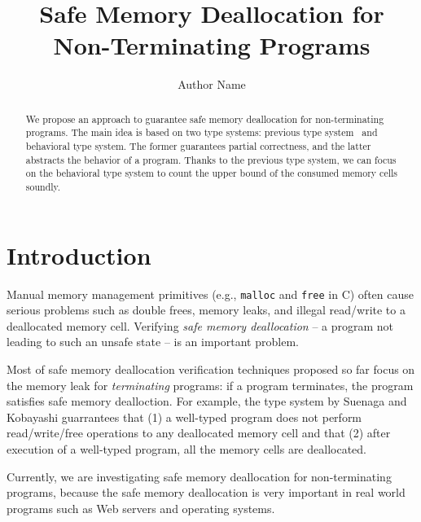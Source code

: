 \documentclass[english]{jssst_ppl} %
\title{Safe Memory Deallocation for Non-Terminating Programs}
\author{Author Name}
\begin{document}
\maketitle
\begin{abstract}
We propose an approach to guarantee safe memory deallocation for non-terminating programs. The main idea is based on two type systems: previous type system~\cite{DBLP:conf/aplas/SuenagaK09} and behavioral type system. The former guarantees partial correctness, and the latter abstracts the behavior of a program. Thanks to the previous type system, we can focus on the behavioral type system to count the upper bound of the consumed memory cells soundly.
\end{abstract}

\section{Introduction}
Manual memory management primitives (e.g., {\tt malloc} and {\tt free} in C) often cause serious problems such as double frees, memory leaks, and illegal read/write to a deallocated memory cell. Verifying \emph{safe memory deallocation} -- a program not leading to such an unsafe state -- is an important problem.

Most of safe memory deallocation verification techniques proposed so far \cite{DBLP:conf/aplas/SuenagaK09,DBLP:conf/pldi/HeineL03,DBLP:conf/sigsoft/XieA05,DBLP:journals/scp/SwamyHMGJ06} focus on the memory leak for \emph{terminating} programs: if a program terminates, the program satisfies safe memory dealloction. For example, the type system by Suenaga and Kobayashi \cite{DBLP:conf/aplas/SuenagaK09} guarrantees that (1) a well-typed program does not perform read/write/free operations to any deallocated memory cell and that (2) after execution of a well-typed program, all the memory cells are deallocated.

Currently, we are investigating safe memory deallocation for non-terminating programs, because the safe memory deallocation is very important in real world programs such as Web servers and operating systems.
\end{document}
